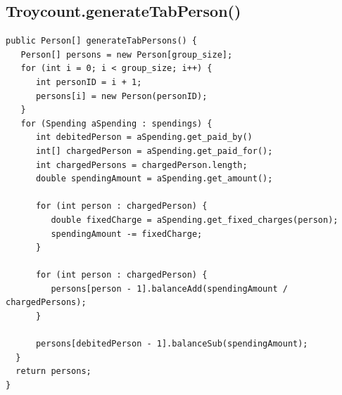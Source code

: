 \documentclass[12pt, a4paper, table]{article}
\begin{document}
\subsection*{Troycount.generateTabPerson()}
\begin{lstlisting}
public Person[] generateTabPersons() {
   Person[] persons = new Person[group_size];
   for (int i = 0; i < group_size; i++) {
      int personID = i + 1;
      persons[i] = new Person(personID);
   }
   for (Spending aSpending : spendings) {
      int debitedPerson = aSpending.get_paid_by()
      int[] chargedPerson = aSpending.get_paid_for();
      int chargedPersons = chargedPerson.length;
      double spendingAmount = aSpending.get_amount();
  
      for (int person : chargedPerson) { 
         double fixedCharge = aSpending.get_fixed_charges(person);
         spendingAmount -= fixedCharge;
      } 
      
      for (int person : chargedPerson) {
         persons[person - 1].balanceAdd(spendingAmount / chargedPersons);
      }
  
      persons[debitedPerson - 1].balanceSub(spendingAmount);
  }
  return persons;
}
\end{lstlisting}
\end{document}
